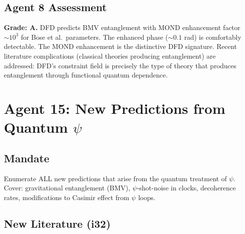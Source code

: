 \documentclass[11pt,a4paper]{article}
\begin{document}
\subsection{Agent 8 Assessment}

\textbf{Grade: A.} DFD predicts BMV entanglement with MOND enhancement factor $\sim 10^3$ for Bose et al.\ parameters. The enhanced phase ($\sim 0.1$ rad) is comfortably detectable. The MOND enhancement is the distinctive DFD signature. Recent literature complications (classical theories producing entanglement) are addressed: DFD's constraint field is precisely the type of theory that produces entanglement through functional quantum dependence.


\newpage
\section{Agent 15: New Predictions from Quantum $\psi$}
\label{sec:agent15}

\subsection{Mandate}

Enumerate ALL new predictions that arise from the quantum treatment of $\psi$. Cover: gravitational entanglement (BMV), $\psi$-shot-noise in clocks, decoherence rates, modifications to Casimir effect from $\psi$ loops.

\subsection{New Literature (i32)}
\end{document}
